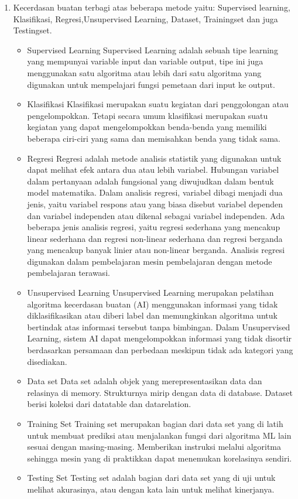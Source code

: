 \begin{enumerate}
	\item Kecerdasan buatan terbagi atas beberapa metode yaitu:
	\hfill\break
	Supervised learning,  Klasifikasi, Regresi,Unsupervised Learning, Dataset, Trainingset dan juga Testingset.
	\begin{itemize}
		\item Supervised Learning
		\hfill\break
	Supervised Learning adalah sebuah tipe learning yang mempunyai variable input dan variable output, tipe ini juga menggunakan satu algoritma atau lebih dari satu algoritma yang digunakan untuk mempelajari fungsi  pemetaan dari input ke output.
		\item Klasifikasi
		\hfill\break
		Klasifikasi merupakan suatu kegiatan dari penggolongan atau pengelompokkan. Tetapi secara umum klasifikasi merupakan suatu kegiatan yang dapat mengelompokkan benda-benda yang memiliki beberapa ciri-ciri yang sama dan memisahkan benda yang tidak sama. 
		\item Regresi
		\hfill\break
        Regresi adalah metode analisis statistik yang digunakan untuk dapat melihat efek antara dua atau lebih variabel. Hubungan variabel dalam pertanyaan adalah fungsional yang diwujudkan dalam bentuk model matematika. Dalam analisis regresi, variabel dibagi menjadi dua jenis, yaitu variabel respons atau yang biasa disebut variabel dependen dan variabel independen atau dikenal sebagai variabel independen. Ada beberapa jenis analisis regresi, yaitu regresi sederhana yang mencakup linear sederhana dan regresi non-linear sederhana dan regresi berganda yang mencakup banyak linier atau non-linear berganda. Analisis regresi digunakan dalam pembelajaran mesin pembelajaran dengan metode pembelajaran terawasi.
		\item Unsupervised Learning 
		\hfill\break
        Unsupervised Learning merupakan pelatihan algoritma kecerdasan buatan (AI) menggunakan informasi yang tidak diklasifikasikan atau diberi label dan memungkinkan algoritma untuk bertindak atas informasi tersebut tanpa bimbingan. Dalam Unsupervised Learning, sistem AI dapat mengelompokkan informasi yang tidak disortir berdasarkan persamaan dan perbedaan meskipun tidak ada kategori yang disediakan.
		\item Data set
		\hfill\break
        Data set adalah objek yang merepresentasikan data dan relasinya di memory. Strukturnya mirip dengan data di database. Dataset berisi koleksi dari datatable dan datarelation.
		\item Training Set
		\hfill\break
    	Training set merupakan bagian dari data set yang di latih untuk membuat prediksi atau menjalankan fungsi dari algoritma ML lain sesuai dengan masing-masing. Memberikan instruksi melalui algoritma sehingga mesin yang di praktikkan dapat menemukan korelasinya sendiri.	
		\item Testing Set
		\hfill\break
        Testing set adalah bagian dari data set yang di uji untuk melihat akurasinya, atau dengan kata lain untuk melihat kinerjanya.
	\end{itemize}
\end{enumerate}
